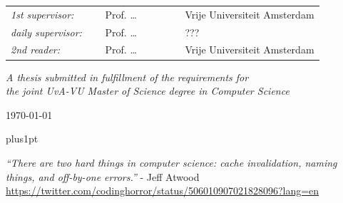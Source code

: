 \documentclass[twoside,11pt]{PhDthesisPSnPDF}
\begin{document}
\begin{center}
\begin{tabular}{ll}
{\it 1st supervisor:}   & ~~ Prof. \ldots ~~~~~~~~~ Vrije Universiteit Amsterdam \\
{\it daily supervisor:} & ~~ Prof. \ldots ~~~~~~~~~ ??? \\
{\it 2nd reader:}       & ~~ Prof. \ldots ~~~~~~~~~ Vrije Universiteit Amsterdam
\end{tabular}

\vspace*{2.5cm}

\textit{A thesis submitted in fulfillment of the requirements for\\ the joint UvA-VU Master of Science degree in Computer Science}

\vspace*{1.8cm}

\today\\[4cm] %

\end{center}

\newpage


       
\hfuzz=50pt






\renewcommand\baselinestretch{1.2}
\baselineskip=18pt plus1pt



\begin{center}
\textit{``There are two hard things in computer science: cache invalidation, naming things, and off-by-one errors.''}  - Jeff Atwood \\ \url{https://twitter.com/codinghorror/status/506010907021828096?lang=en}
\end{center}

\newpage



\end{document}
